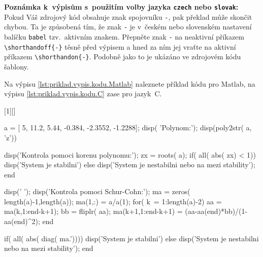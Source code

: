 \vspace{\fill}

\noindent
{\bf Poznámka k~výpisům s~použitím volby jazyka \verb|czech| nebo \verb|slovak|:}\newline
Pokud Váš zdrojový kód obsahuje znak spojovníku \verb|-|, pak překlad může skončit chybou.
Ta je způsobená tím, že znak \verb|-| je v~českém nebo slovenském nastavení balíčku \verb|babel| tzv.\ aktivním znakem.
Přepněte znak \verb|-| na neaktivní příkazem \verb|\shorthandoff{-}| těsně před výpisem a hned za ním jej vraťte na aktivní příkazem \verb|\shorthandon{-}|.
Podobně jako to je ukázáno ve zdrojovém kódu šablony.


\clearpage

Na výpisu \ref{lst:priklad.vypis.kodu.Matlab} naleznete příklad kódu pro Matlab, na výpisu \ref{lst:priklad.vypis.kodu.C} zase pro jazyk~C.

[1][]{%
%
%
\lstset{language=Matlab,numbers=left,#1}%
}{%
%
%
}

\begin{matlab}[frame=single,float=htbp,caption={Příklad Schur-Cohnova testu stability v~prostředí Matlab.},label=lst:priklad.vypis.kodu.Matlab,numberstyle=\scriptsize, numbersep=7pt]

a = [ 5, 11.2, 5.44, -0.384, -2.3552, -1.2288];
disp( 'Polynom:'); disp(poly2str( a, 'z'))

disp('Kontrola pomoci korenu polynomu:');
zx = roots( a);
if( all( abs( zx) < 1))
    disp('System je stabilni')
else
    disp('System je nestabilni nebo na mezi stability');
end

disp(' '); disp('Kontrola pomoci Schur-Cohn:');
ma = zeros( length(a)-1,length(a));
ma(1,:) = a/a(1);
for( k~= 1:length(a)-2)
    aa = ma(k,1:end-k+1);
    bb = fliplr( aa);
    ma(k+1,1:end-k+1) = (aa-aa(end)*bb)/(1-aa(end)^2);
end

if( all( abs( diag( ma.'))))
    disp('System je stabilni')
else
    disp('System je nestabilni nebo na mezi stability');
end
\end{matlab}

